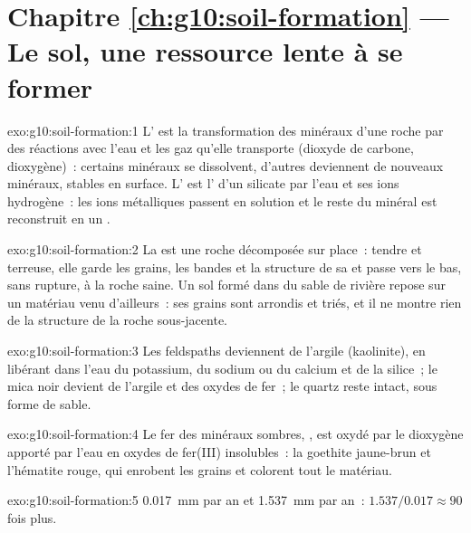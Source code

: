 \section*{Chapitre \ref{ch:g10:soil-formation} --- Le sol, une ressource lente à se former}

\begin{solution}{exo:g10:soil-formation:1}
L' est la transformation des minéraux d'une roche par des
réactions avec l'eau et les gaz qu'elle transporte (dioxyde de carbone,
dioxygène)~: certains minéraux se dissolvent, d'autres deviennent de
nouveaux minéraux, stables en surface. L' est l' d'un silicate par l'eau et ses ions hydrogène~: les ions
métalliques passent en solution et le reste du minéral est reconstruit en un
.
\end{solution}

\begin{solution}{exo:g10:soil-formation:2}
La  est une roche décomposée sur place~: tendre et terreuse, elle
garde les grains, les bandes et la structure de sa  et passe vers
le bas, sans rupture, à la roche saine. Un sol formé dans du sable de
rivière repose sur un matériau venu d'ailleurs~: ses grains sont arrondis
et triés, et il ne montre rien de la structure de la roche sous-jacente.
\end{solution}

\begin{solution}{exo:g10:soil-formation:3}
Les feldspaths deviennent de l'argile (kaolinite), en libérant dans l'eau du
potassium, du sodium ou du calcium et de la silice~; le mica noir devient de
l'argile et des oxydes de fer~; le quartz reste intact, sous forme de
sable.
\end{solution}

\begin{solution}{exo:g10:soil-formation:4}
Le fer des minéraux sombres, , est oxydé par le dioxygène apporté
par l'eau en oxydes de fer(III) insolubles~: la goethite jaune-brun et
l'hématite rouge, qui enrobent les grains et colorent tout le matériau.
\end{solution}

\begin{solution}{exo:g10:soil-formation:5}
\qty{0.017}{mm} par an et \qty{1.537}{mm} par an~: $1.537/0.017 \approx 90$
fois plus.
\end{solution}

